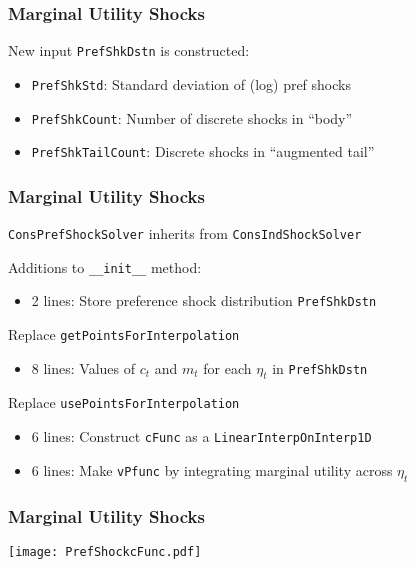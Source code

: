 \documentclass[11pt]{cfpbpresentation}
\begin{document}
\begin{frame}
\frametitle{Marginal Utility Shocks}
New input \texttt{PrefShkDstn} is constructed:
\begin{itemize}
\item \texttt{PrefShkStd}: Standard deviation of (log) pref shocks

\item \texttt{PrefShkCount}: Number of discrete shocks in ``body''

\item \texttt{PrefShkTailCount}: Discrete shocks in ``augmented tail''
\end{itemize}
\end{frame}

\begin{frame}
\frametitle{Marginal Utility Shocks}
\texttt{ConsPrefShockSolver} inherits from \texttt{ConsIndShockSolver}

\begin{block}{Additions to \texttt{\_\_init\_\_} method:}
\begin{itemize}
\item 2 lines: Store preference shock distribution \texttt{PrefShkDstn}
\end{itemize}
\end{block}

\begin{block}{Replace \texttt{getPointsForInterpolation}}
\begin{itemize}
\item 8 lines: Values of $c_t$ and $m_t$ for each $\eta_t$ in \texttt{PrefShkDstn}
\end{itemize}
\end{block}

\begin{block}{Replace \texttt{usePointsForInterpolation}}
\begin{itemize}
\item 6 lines: Construct \texttt{cFunc} as a \texttt{LinearInterpOnInterp1D}

\item 6 lines: Make \texttt{vPfunc} by integrating marginal utility across $\eta_t$
\end{itemize}
\end{block}
\end{frame}

\begin{frame}
\frametitle{Marginal Utility Shocks}
\begin{center}
\texttt{[image: PrefShockcFunc.pdf]}
\end{center}
\end{frame}
\end{document}
